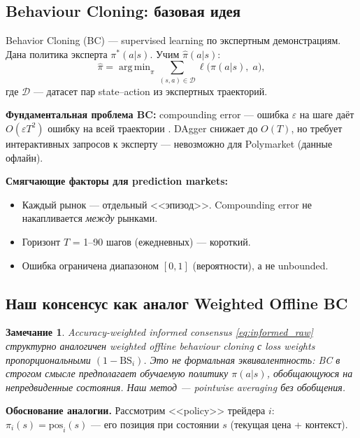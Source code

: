 \documentclass[a4paper, 11pt]{article}
\newtheorem{remark}{Замечание}[section]
\newcommand{\bs}{\mathrm{BS}}
\DeclareMathOperator*{\argmin}{arg\,min}
\begin{document}
\subsection{Behaviour Cloning: базовая идея}

Behavior Cloning (BC) --- supervised learning по экспертным демонстрациям.
Дана политика эксперта $\pi^*(a|s)$. Учим $\hat{\pi}(a|s)$:
\begin{equation}
\label{eq:bc}
\hat{\pi} = \argmin_{\pi} \sum_{(s,a) \in \mathcal{D}} \ell\!\bigl(\pi(a|s),\; a\bigr),
\end{equation}
где $\mathcal{D}$ --- датасет пар state--action из экспертных траекторий.

\textbf{Фундаментальная проблема BC:}
compounding error --- ошибка $\varepsilon$ на шаге даёт $O(\varepsilon T^2)$ ошибку
на всей траектории \citep{ross2011reduction}.
DAgger \citep{ross2011reduction} снижает до $O(T)$, но требует
интерактивных запросов к эксперту --- невозможно для Polymarket (данные офлайн).

\textbf{Смягчающие факторы для prediction markets:}
\begin{itemize}[nosep]
  \item Каждый рынок --- отдельный <<эпизод>>. Compounding error не накапливается \emph{между} рынками.
  \item Горизонт $T$ = 1--90 шагов (ежедневных) --- короткий.
  \item Ошибка ограничена диапазоном $[0, 1]$ (вероятности), а не unbounded.
\end{itemize}

\subsection{Наш консенсус как аналог Weighted Offline BC}

\begin{remark}
Accuracy-weighted informed consensus \eqref{eq:informed_raw} \emph{структурно аналогичен}
weighted offline behaviour cloning с loss weights пропорциональными $(1 - \bs_i)$.
Это не формальная эквивалентность: BC в строгом смысле предполагает
обучаемую политику $\pi(a|s)$, обобщающуюся на непредвиденные состояния.
Наш метод --- pointwise averaging без обобщения.
\end{remark}

\textbf{Обоснование аналогии.}
Рассмотрим <<policy>> трейдера $i$: $\pi_i(s) = \mathrm{pos}_i(s)$
--- его позиция при состоянии $s$ (текущая цена + контекст).
\end{document}

